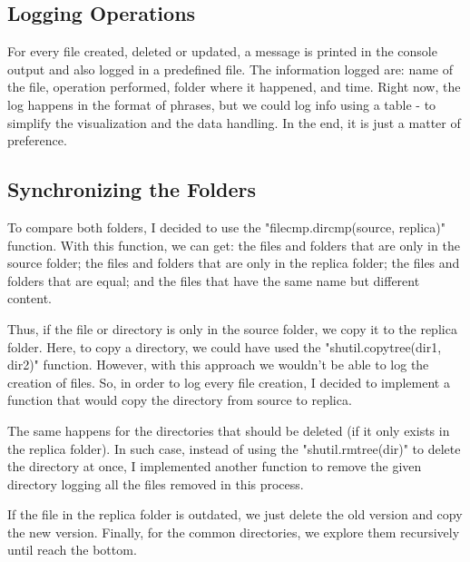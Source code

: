 \documentclass{article}
\begin{document}
\subsection{Logging Operations}

For every file created, deleted or updated, a message is printed in the console output and also logged in a predefined file. The information logged are: name of the file, operation performed, folder where it happened, and time. 
Right now, the log happens in the format of phrases, but we could log info using a table - to simplify the visualization and the data handling. In the end, it is just a matter of preference.

\subsection{Synchronizing the Folders}


To compare both folders, I decided to use the "filecmp.dircmp(source, replica)" function. With this function, we can get: the files and folders that are only in the source folder; the files and folders that are only in the replica folder; the files and folders that are equal; and the files that have the same name but different content.

Thus, if the file or directory is only in the source folder, we copy it to the replica folder. Here, to copy a directory, we could have used the "shutil.copytree(dir1, dir2)" function. However, with this approach we wouldn't be able to log the creation of files. So, in order to log every file creation, I decided to implement a function that would copy the directory from source to replica.

The same happens for the directories that should be deleted (if it only exists in the replica folder). In such case, instead of using the "shutil.rmtree(dir)" to delete the directory at once, I implemented another function to remove the given directory logging all the files removed in this process.

If the file in the replica folder is outdated, we just delete the old version and copy the new version. Finally, for the common directories, we explore them recursively until reach the bottom.
\end{document}
